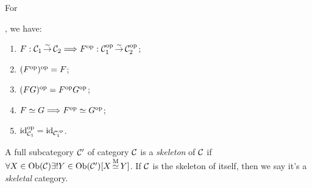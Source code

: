 \documentclass{article}
\begin{document}
\begin{cor}\label{op}
	For , we have:
	\begin{enumerate}
		\item $F:\mathcal{C}_1\mathop{\to}\limits^{\sim}\mathcal{C}_2\Longrightarrow F^\mathrm{op}:\mathcal{C}^\mathrm{op}_1\mathop{\to}\limits^{\sim}\mathcal{C}^\mathrm{op}_2$;
		\item $(F^\mathrm{op})^\mathrm{op}=F$;
		\item $(FG)^\mathrm{op}=F^\mathrm{op} G^\mathrm{op}$;
		\item $F\simeq G\Longrightarrow F^\mathrm{op}\simeq G^\mathrm{op}$;
		\item $\mathrm{id}^\mathrm{op}_{\mathcal{C}_1}=\mathrm{id}_{\mathcal{C}^\mathrm{op}_1}$.
	\end{enumerate}
\end{cor}


\begin{defi}\label{skeleton}
	A full subcategory $\mathcal{C}'$ of category $\mathcal{C}$ is a \emph{skeleton} of $\mathcal{C}$ if $\forall X\in\mathrm{Ob}(\mathcal{C})\exists! Y\in\mathrm{Ob}(\mathcal{C}')[X\mathop{\simeq}\limits^\mathrm{M}Y]$. If $\mathcal{C}$ is the skeleton of itself, then we say it's a \emph{skeletal} category.
\end{defi}
\end{document}
